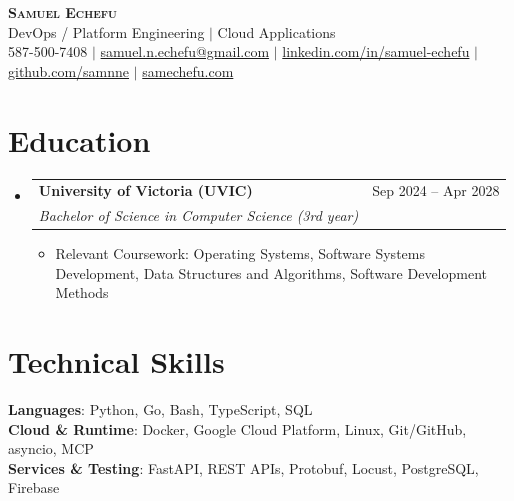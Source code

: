\documentclass[letterpaper,10pt]{article}
\makeatletter
\newcommand{\resumeItem}[1]{
  \item\small{
    {#1 \vspace{-1pt}}
  }
}
\newcommand{\resumeSubheading}[4]{
  \vspace{-2pt}\item
    \begin{tabular*}{0.97\textwidth}[t]{l@{\extracolsep{\fill}}r}
      \textbf{#1} & #2 \\
      \textit{\small#3} & \textit{\small #4} \\
    \end{tabular*}\vspace{-6pt}
}
\newcommand{\resumeSubHeadingListStart}{\begin{itemize}[leftmargin=0.15in, label={}]}
\newcommand{\resumeSubHeadingListEnd}{\end{itemize}}
\newcommand{\resumeItemListStart}{\begin{itemize}[label=$\bullet$, itemsep=1.20pt, topsep=0pt, parsep=0pt]}
\newcommand{\resumeItemListEnd}{\end{itemize}\vspace{-2pt}}
\makeatother
\begin{document}
\begin{center}
    \textbf{\Huge \scshape Samuel Echefu} \\ \vspace{3pt}
    \small DevOps / Platform Engineering $|$ Cloud Applications \\ \vspace{3pt}
    \small 587-500-7408 $|$ \href{mailto:samuel.n.echefu@gmail.com}{samuel.n.echefu@gmail.com} $|$ 
    \href{https://linkedin.com/in/samuel-echefu-251a21336}{linkedin.com/in/samuel-echefu} $|$
    \href{https://github.com/samnne}{github.com/samnne} $|$
    \href{https://samechefu.com}{samechefu.com}
\end{center}


\section{Education}
\resumeSubHeadingListStart
\resumeSubheading{University of Victoria (UVIC)}{Sep 2024 -- Apr 2028}{Bachelor of Science in Computer Science (3rd year)}{}
\resumeItemListStart
  \resumeItem{Relevant Coursework: Operating Systems, Software Systems Development, Data Structures and Algorithms, Software Development Methods}
\resumeItemListEnd
\resumeSubHeadingListEnd

\section{Technical Skills}
 \begin{itemize}[leftmargin=0.15in, label={}]
    \small{\item{
     \textbf{Languages}{: Python, Go, Bash, TypeScript, SQL} \\ \vspace{0pt}
     \textbf{Cloud \& Runtime}{: Docker, Google Cloud Platform, Linux, Git/GitHub, asyncio, MCP} \\ \vspace{0pt}
     \textbf{Services \& Testing}{: FastAPI, REST APIs, Protobuf, Locust, PostgreSQL, Firebase}
    }}
 \end{itemize}
\end{document}
